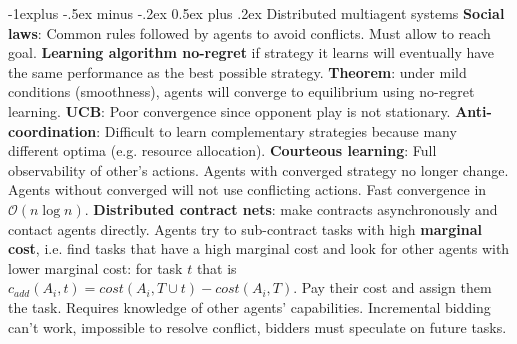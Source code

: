 \documentclass{article}
\makeatletter
\renewcommand{\subsection}{\@startsection{subsection}{2}{0mm}%
                                {-1explus -.5ex minus -.2ex}%
                                {0.5ex plus .2ex}%
                                {\color{blue}\normalfont\scriptsize\bfseries}}
\newcommand{\disadv}[1]{{\color{red} #1}}
\makeatother
\begin{document}
\begin{multicols*}{4}
\subsection{Distributed multiagent systems}
\textbf{Social laws}: Common rules followed by agents to avoid conflicts. Must allow to reach goal. \textbf{Learning algorithm no-regret} if strategy it learns will eventually have the same performance as the best possible strategy.
\textbf{Theorem}: under mild conditions (smoothness), agents will converge to equilibrium using no-regret learning.
\textbf{UCB}: \disadv{Poor convergence since opponent play is not stationary}.
\textbf{Anti-coordination}: Difficult to learn complementary strategies because many different optima (e.g. resource allocation).
\textbf{Courteous learning}: Full observability of other's actions. Agents with converged strategy no longer change. Agents without converged will not use conflicting actions. Fast convergence in $\mathcal{O}(n\log n)$.
\textbf{Distributed contract nets}: make contracts asynchronously and contact agents directly. Agents try to sub-contract tasks with high \textbf{marginal cost}, i.e. find tasks that have a high marginal cost and look for other agents with lower marginal cost: for task $t$ that is $c_{add}(A_i,t)=cost(A_i,T \cup t)-cost(A_i,T)$. Pay their cost and assign them the task. \disadv{Requires knowledge of other agents' capabilities. Incremental bidding can't work, impossible to resolve conflict, bidders must speculate on future tasks.}

\end{multicols*}
\end{document}
